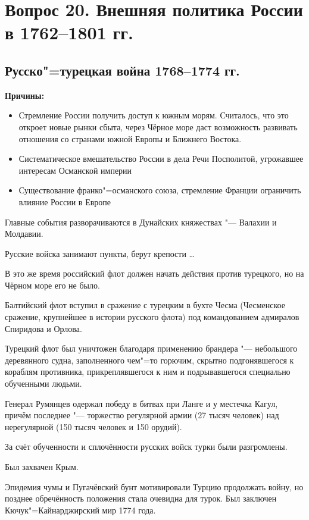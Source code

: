\section{Вопрос 20. Внешняя политика России в 1762--1801 гг.}

\subsection{Русско"=турецкая война 1768--1774 гг.}

\textbf{Причины:}

\begin{itemize}
    \item{ Стремление России получить доступ к южным морям. Считалось, что это откроет новые рынки сбыта, через Чёрное море даст возможность развивать отношения со странами южной Европы и Ближнего Востока. }
    \item{ Систематическое вмешательство России в дела Речи Посполитой, угрожавшее интересам Османской империи }
    \item{ Существование франко"=османского союза, стремление Франции ограничить влияние России в Европе }
\end{itemize}

Главные события разворачиваются в Дунайских княжествах "--- Валахии и Молдавии.  

Русские войска занимают пункты, берут крепости \ldots

В это же время российский флот должен начать действия против турецкого, но на Чёрном море его не было. 

Балтийский флот вступил в сражение с турецким в бухте Чесма (Чесменское сражение, крупнейшее в истории русского флота) под командованием адмиралов Спиридова и Орлова. 

Турецкий флот был уничтожен благодаря применению брандера "--- небольшого деревянного судна, заполненного чем"=то горючим, скрытно подгонявшегося к кораблям противника, прикреплявшегося к ним и подрывавшегося специально обученными людьми.

Генерал Румянцев одержал победу в битвах при Ланге и у местечка Кагул, причём последнее "--- торжество регулярной армии (27 тысяч человек) над нерегулярной (150 тысяч человек и 150 орудий). 

За счёт обученности и сплочённости русских войск турки были разгромлены.

Был захвачен Крым.

Эпидемия чумы и Пугачёвский бунт мотивировали Турцию продолжать войну, но позднее обречённость положения стала очевидна для турок. Был заключен Кючук"=Кайнарджирский мир 1774 года.

